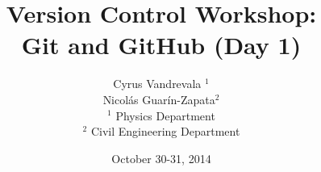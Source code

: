 



\title{Version Control Workshop: \\Git and GitHub (Day 1)}
\subtitle{}
\author[AUTHOR]{\scriptsize{Cyrus Vandrevala $^1$\\Nicol\'as Guar\'in-Zapata$^2$}\\
\tiny{$^1$ Physics Department\\ $^2$ Civil Engineering Department}}
\date{October 30-31, 2014}


















